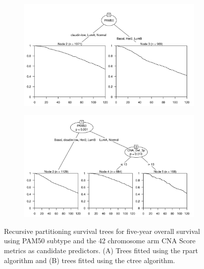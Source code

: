 \begin{figure}[!htb]
\centering

\vspace{0.5cm}

\begin{subfigure}{\textwidth}
\subcaption{}
\includegraphics[width=1\textwidth]{../figures/Appendices/Appendix_B/PA_PartyKit_Survival_Score_TenYearOS_PAM50.png}
\end{subfigure}

\vspace{2cm}

\begin{subfigure}{\textwidth}
\subcaption{}
\includegraphics[width=1\textwidth]{../figures/Appendices/Appendix_B/PA_Ctree_Survival_Score_TenYearOS_PAM50.png}
\end{subfigure}

\vspace{0.5cm}

\caption[Recursive partitioning survival trees for five-year overall survival using PAM50 subtype and the 42 chromosome arm CNA Score metrics as candidate predictors.]{Recursive partitioning survival trees for five-year overall survival using PAM50 subtype and the 42 chromosome arm CNA Score metrics as candidate predictors. (A) Trees fitted using the rpart algorithm and (B) trees fitted using the ctree algorithm.}
\end{figure}

